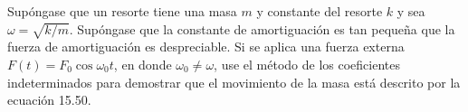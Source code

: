 \item Supóngase que un resorte tiene una masa $m$ y constante del resorte $k$ y sea $\omega = \sqrt{k/m}$. Supóngase que la constante de amortiguación es tan pequeña que la fuerza de amortiguación es despreciable. Si se aplica una fuerza externa $F(t) = F_0 \cos \omega_0 t$, en donde $\omega_0 \ne \omega$, use el método de los coeficientes indeterminados para demostrar que el movimiento de la masa está descrito por la ecuación 15.50.
